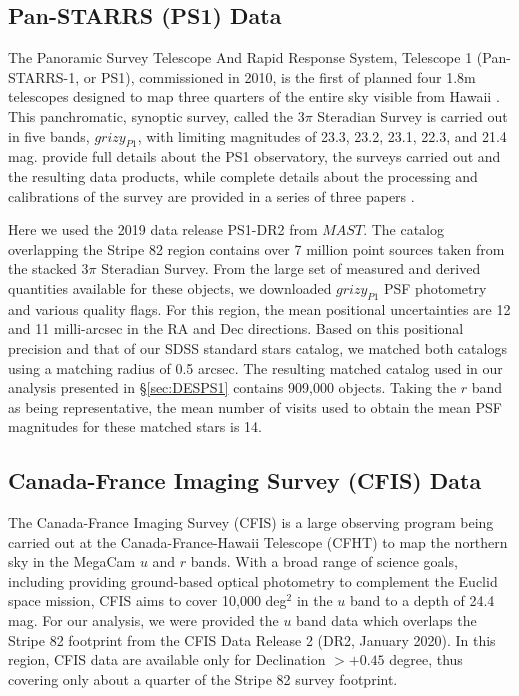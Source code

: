 \documentclass{aastex63}
\begin{document}

\subsection{Pan-STARRS (PS1) Data} \label{ssec:ps1}
 
The Panoramic Survey Telescope And Rapid Response System, Telescope 1 (Pan-STARRS-1, or PS1), commissioned 
in 2010, is the first of planned four 1.8m telescopes designed to map three quarters of the entire sky visible from 
Hawaii \citep{2010SPIE.7733E..0EK}. This panchromatic, synoptic survey, called the 3$\pi$ Steradian Survey is 
carried out in five bands, $grizy_{P1}$, with limiting magnitudes of 23.3, 23.2, 23.1, 22.3, and 21.4 mag. 
\citet{2016arXiv161205560C}  provide full details about the PS1 observatory, the surveys carried out and the 
resulting data products, while complete details about the processing and calibrations of the survey are 
provided in a series of three papers \cite{Euge20a, Euge20b, Euge20c}. 
 
Here we used the 2019 data release PS1-DR2 from $MAST$. The catalog overlapping the Stripe 82 region contains 
over 7 million point sources taken from the stacked 3$\pi$ Steradian Survey. From the large set of measured and 
derived quantities available for these objects, we downloaded $grizy_{P1}$ PSF photometry and various quality flags. 
For this region, the mean positional uncertainties are 12 and 11 milli-arcsec in the RA and Dec directions. Based 
on this positional precision and that of our SDSS standard stars catalog, we matched both catalogs using a matching 
radius of 0.5 arcsec. The resulting matched catalog used in our analysis presented in \S \ref{sec:DESPS1} contains 
909,000 objects. Taking the $r$ band as being representative, the mean number of visits used to obtain the mean 
PSF magnitudes for these matched stars is 14. 
        

\subsection{Canada-France Imaging Survey (CFIS) Data} \label{ssec:cfis}

The Canada-France Imaging Survey (CFIS) is a large observing program being carried out at the Canada-France-Hawaii 
Telescope (CFHT) to map the northern sky in the MegaCam $u$ and $r$ bands. With a broad range of science goals, 
including providing ground-based optical photometry to complement the Euclid space mission, CFIS aims to cover 
10,000 deg$^2$ in the $u$ band to a depth of 24.4 mag. For our analysis, we were provided the $u$ band data which 
overlaps the Stripe 82 footprint from the CFIS Data Release 2 (DR2, January 2020). In this region, CFIS data are available
only for Declination $>+0.45$ degree, thus covering only about a quarter of the Stripe 82 survey footprint. 
\end{document}
